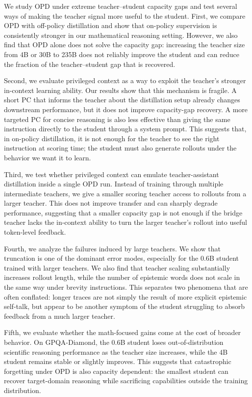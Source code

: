 We study OPD under extreme teacher--student capacity gaps and test several ways of making the teacher signal more useful to the student. First, we compare OPD with off-policy distillation and show that on-policy supervision is consistently stronger in our mathematical reasoning setting. However, we also find that OPD alone does not solve the capacity gap: increasing the teacher size from 4B or 30B to 235B does not reliably improve the student and can reduce the fraction of the teacher--student gap that is recovered.

Second, we evaluate privileged context as a way to exploit the teacher's stronger in-context learning ability. Our results show that this mechanism is fragile. A short PC that informs the teacher about the distillation setup already changes downstream performance, but it does not improve capacity-gap recovery. A more targeted PC for concise reasoning is also less effective than giving the same instruction directly to the student through a system prompt. This suggests that, in on-policy distillation, it is not enough for the teacher to see the right instruction at scoring time; the student must also generate rollouts under the behavior we want it to learn.

Third, we test whether privileged context can emulate teacher-assistant distillation inside a single OPD run. Instead of training through multiple intermediate teachers, we give a smaller scoring teacher access to rollouts from a larger teacher. This does not improve transfer and can sharply degrade performance, suggesting that a smaller capacity gap is not enough if the bridge teacher lacks the in-context ability to turn the larger teacher's rollout into useful token-level feedback.

Fourth, we analyze the failures induced by large teachers. We show that truncation is one of the dominant error modes, especially for the 0.6B student trained with larger teachers. We also find that teacher scaling substantially increases rollout length, while the number of epistemic words does not scale in the same way under brevity instructions. This separates two phenomena that are often conflated: longer traces are not simply the result of more explicit epistemic self-talk, but appear to be another symptom of the student struggling to absorb feedback from a much larger teacher.

Fifth, we evaluate whether the math-focused gains come at the cost of broader behavior. On GPQA-Diamond, the 0.6B student loses out-of-distribution scientific reasoning performance as the teacher size increases, while the 4B student remains stable or slightly improves. This suggests that catastrophic forgetting under OPD is also capacity dependent: the smallest student can recover target-domain reasoning while sacrificing capabilities outside the training distribution.

